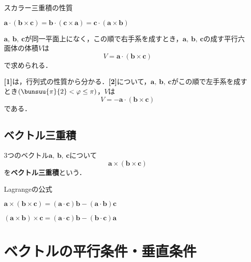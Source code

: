 \begin{kousiki}{スカラー三重積の性質}
	\begin{enumerate}[label=\textbf{[\arabic*]}, labelsep=10pt, leftmargin=23pt]
		\item $\bm{a} \cdot (\bm{b} \times \bm{c}) = \bm{b} \cdot (\bm{c} \times \bm{a}) = \bm{c} \cdot (\bm{a} \times \bm{b})$
		\item $\bm{a},\ \bm{b},\ \bm{c}$が同一平面上になく，この順で右手系を成すとき，$\bm{a},\ \bm{b},\ \bm{c}$の成す平行六面体の体積$V$は
		\begin{equation}
			V = \bm{a} \cdot (\bm{b} \times \bm{c})
		\end{equation}
		で求められる．
	\end{enumerate}
\end{kousiki}

\textbf{[1]}は，行列式の性質から分かる．\textbf{[2]}について，$\bm{a},\ \bm{b},\ \bm{c}$がこの順で左手系を成すとき$\left(\bunsuu{\pi}{2} < \varphi \le \pi\right)$，$V$は
\begin{equation}
	V = -\bm{a} \cdot (\bm{b} \times \bm{c})
\end{equation}
である．



\subsection{ベクトル三重積}

3つのベクトル$\bm{a},\ \bm{b},\ \bm{c}$について
\begin{equation}
	\bm{a} \times (\bm{b} \times \bm{c})
\end{equation}
を\textbf{ベクトル三重積}という．

\begin{kousiki}{Lagrangeの公式}
	\begin{enumerate}[label=\textbf{[\arabic*]}, labelsep=10pt, leftmargin=23pt]
		\item $\bm{a} \times (\bm{b} \times \bm{c}) = (\bm{a} \cdot \bm{c})\bm{b} - (\bm{a} \cdot \bm{b})\bm{c}$
		\item $(\bm{a} \times \bm{b}) \times \bm{c} = (\bm{a} \cdot \bm{c})\bm{b} - (\bm{b} \cdot \bm{c})\bm{a}$
	\end{enumerate}
\end{kousiki}



\section{ベクトルの平行条件・垂直条件}

